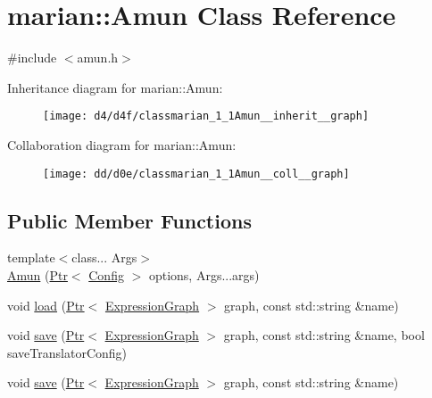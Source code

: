 \hypertarget{classmarian_1_1Amun}{}\section{marian\+:\+:Amun Class Reference}
\label{classmarian_1_1Amun}


{\ttfamily \#include $<$amun.\+h$>$}



Inheritance diagram for marian\+:\+:Amun\+:
\nopagebreak
\begin{figure}[H]
\begin{center}
\leavevmode
\texttt{[image: d4/d4f/classmarian\_1\_1Amun\_\_inherit\_\_graph]}
\end{center}
\end{figure}


Collaboration diagram for marian\+:\+:Amun\+:
\nopagebreak
\begin{figure}[H]
\begin{center}
\leavevmode
\texttt{[image: dd/d0e/classmarian\_1\_1Amun\_\_coll\_\_graph]}
\end{center}
\end{figure}
\subsection*{Public Member Functions}
\begin{DoxyCompactItemize}
\item 
{\footnotesize template$<$class... Args$>$ }\\\hyperlink{classmarian_1_1Amun_abcf8225ac2c7895bfc41b9df02ed46c9}{Amun} (\hyperlink{namespacemarian_ad1a373be43a00ef9ce35666145137b08}{Ptr}$<$ \hyperlink{classmarian_1_1Config}{Config} $>$ options, Args...\+args)
\item 
void \hyperlink{classmarian_1_1Amun_a0e8ed942ad3b414f43f29dbb6e9081eb}{load} (\hyperlink{namespacemarian_ad1a373be43a00ef9ce35666145137b08}{Ptr}$<$ \hyperlink{classmarian_1_1ExpressionGraph}{Expression\+Graph} $>$ graph, const std\+::string \&name)
\item 
void \hyperlink{classmarian_1_1Amun_a81589662d8f3eebf52cebf4ba395ef2a}{save} (\hyperlink{namespacemarian_ad1a373be43a00ef9ce35666145137b08}{Ptr}$<$ \hyperlink{classmarian_1_1ExpressionGraph}{Expression\+Graph} $>$ graph, const std\+::string \&name, bool save\+Translator\+Config)
\item 
void \hyperlink{classmarian_1_1Amun_a2ac35e1d3b74293cad107512005b2b17}{save} (\hyperlink{namespacemarian_ad1a373be43a00ef9ce35666145137b08}{Ptr}$<$ \hyperlink{classmarian_1_1ExpressionGraph}{Expression\+Graph} $>$ graph, const std\+::string \&name)
\end{DoxyCompactItemize}
